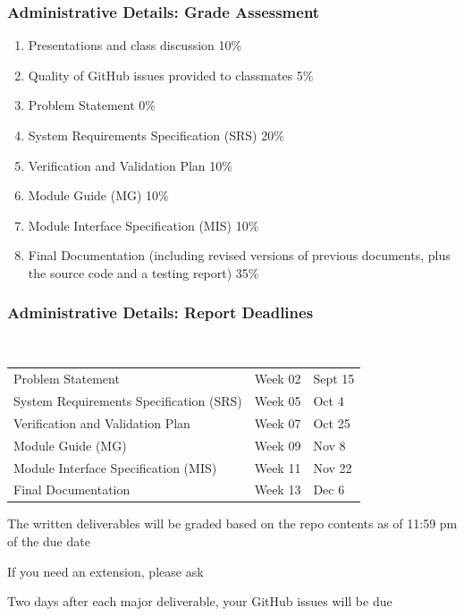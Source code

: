 \documentclass[t,12pt,numbers,fleqn]{beamer}
\begin{document}
\begin{frame}
\frametitle{Administrative Details: Grade Assessment}

\begin {enumerate}

\item Presentations and class discussion 10\%

\item Quality of GitHub issues provided to classmates 5\%

\item Problem Statement 0\%

\item System Requirements Specification (SRS) 20\%

\item Verification and Validation Plan 10\%

\item Module Guide (MG) 10\%

\item Module Interface Specification (MIS) 10\%

\item Final Documentation (including revised versions of previous documents,
  plus the source code and a testing report) 35\%

\end {enumerate}

\end{frame}


\begin{frame}
\frametitle{Administrative Details: Report Deadlines}
~\newline
\begin{tabular}{l l l}
Problem Statement & Week 02 & Sept 15\\
System Requirements Specification (SRS) & Week 05 & Oct 4\\
Verification and Validation Plan & Week 07 & Oct 25\\
Module Guide (MG) & Week 09 & Nov 8\\
Module Interface Specification (MIS) & Week 11 & Nov 22\\
Final Documentation & Week 13 & Dec 6\\
\end {tabular}

\bi
\item The written deliverables will be graded based on the repo contents as of
11:59 pm of the due date
\item If you need an extension, please ask
\item Two days after each major deliverable, your GitHub issues will be due
\ei

\end{frame}
\end{document}
